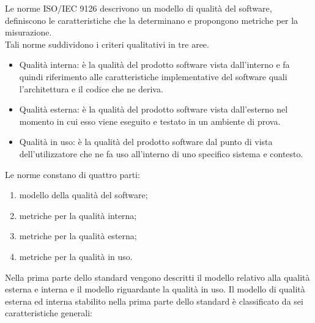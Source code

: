 	Le norme ISO/IEC 9126 descrivono un modello di qualità del software, definiscono le caratteristiche che la determinano e propongono metriche per la misurazione.\\
	Tali norme suddividono i criteri qualitativi in tre aree.
	\begin{itemize}
		\item Qualità interna: è la qualità del prodotto software vista dall’interno e fa quindi riferimento alle caratteristiche implementative del software quali l’architettura e il codice che ne deriva.
		\item Qualità esterna: è la qualità del prodotto software vista dall’esterno nel momento in cui esso viene eseguito e testato in un ambiente di prova.
		\item Qualità in uso: è la qualità del prodotto software dal punto di vista dell’utilizzatore che ne fa uso all’interno di uno specifico sistema e contesto.
	\end{itemize}
	Le norme constano di quattro parti:
	\begin{enumerate}
		\item modello della qualità del software;
		\item metriche per la qualità interna;
		\item metriche per la qualità esterna;
		\item metriche per la qualità in uso.
	\end{enumerate}
		Nella prima parte dello standard vengono descritti il modello relativo alla qualità esterna e interna e il modello riguardante la qualità in uso.
			Il modello di qualità esterna ed interna stabilito nella prima parte dello standard è classificato da sei caratteristiche generali:
